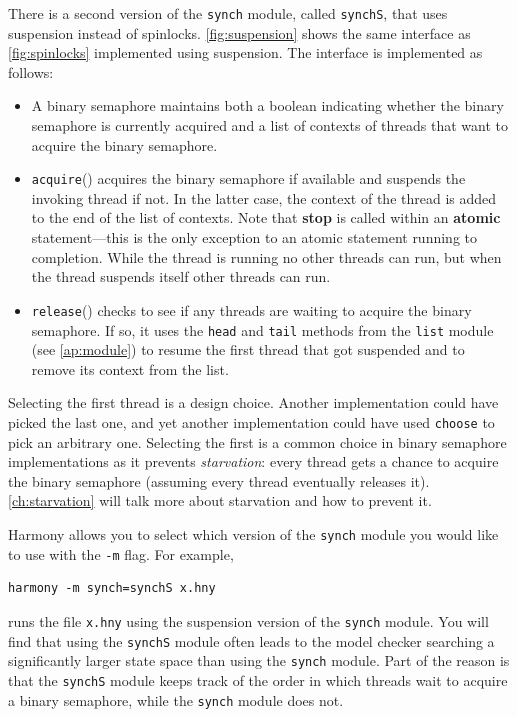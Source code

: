 \documentclass{report}
\newenvironment{code}{
\tcolorbox
}{
\endtcolorbox
}
\begin{document}
There is a second version of the \texttt{synch} module, called \texttt{synchS},
that uses suspension instead of spinlocks.
\autoref{fig:suspension} shows the same interface
as \autoref{fig:spinlocks} implemented using suspension.
The interface is implemented as follows:
\begin{itemize}
\item A binary semaphore maintains both a boolean indicating whether the
binary semaphore is currently acquired and a list of contexts of threads that want to
acquire the binary semaphore.
\item
\texttt{acquire}()
%
acquires the binary semaphore if available and suspends the invoking thread if not.
In the latter case, the context of the thread is added to the end of the list of contexts.
Note that \textbf{stop} is called within an \textbf{atomic} statement---this is
the only exception to an atomic statement running to completion.  While the
thread is running no other threads can run, but when the thread suspends itself
other threads can run.
\item
\texttt{release}()
%
checks to see if any threads are waiting to acquire the binary semaphore.
If so, it uses the \texttt{head} and \texttt{tail}
methods from the \texttt{list} module (see \autoref{ap:module})
to resume the first thread that got
suspended and to remove its context from the list.
\end{itemize}
Selecting the first thread is a design choice.  Another implementation could
have picked the last one, and yet another implementation could have used
\texttt{choose} to pick an arbitrary one.  Selecting the first is a common
choice in binary semaphore implementations as it prevents \emph{starvation}:
%
every thread
gets a chance to acquire the binary semaphore (assuming every thread eventually releases
it).  \autoref{ch:starvation} will talk more about starvation and how
to prevent it.

Harmony allows you to select which version of the \texttt{synch} module you would
like to use with the \texttt{-m} flag.
%
For example,

\begin{code}
\begin{verbatim}
harmony -m synch=synchS x.hny
\end{verbatim}
\end{code}

runs the file \texttt{x.hny} using the suspension version of the \texttt{synch} module.
You will find that using the \texttt{synchS} module often leads to
the model checker searching a
significantly larger state space than using the \texttt{synch} module.
Part of the reason is that the \texttt{synchS} module keeps track of the order
in which threads wait to acquire a binary semaphore, while the \texttt{synch} module does not.
\end{document}
